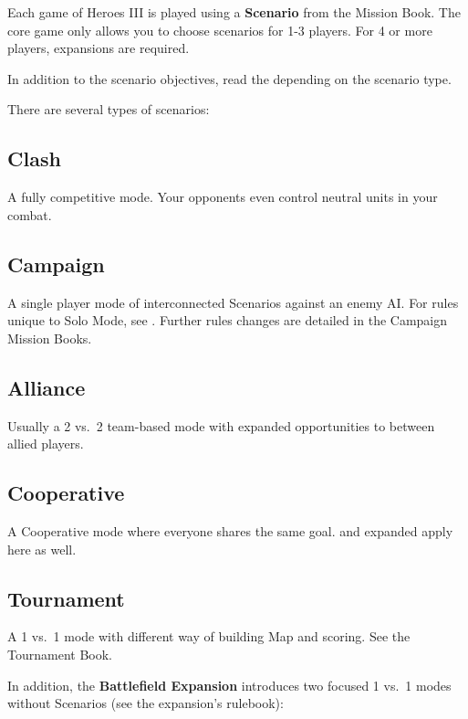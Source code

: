 
\begin{multicols*}{2}

Each game of Heroes III is played using a \textbf{Scenario} from the Mission Book. 
The core game only allows you to choose scenarios for 1-3 players. For 4 or more players, expansions are required.\par
In addition to the scenario objectives, read the  depending on the scenario type.\par 
There are several types of scenarios:

\subsection*{Clash}
A fully competitive mode. Your opponents even control neutral units in your combat.

\subsection*{Campaign}
A single player mode of interconnected Scenarios against an enemy AI.
For rules unique to Solo Mode, see .
Further rules changes are detailed in the Campaign Mission Books.

\subsection*{Alliance}
Usually a 2 vs.~2 team-based mode with expanded opportunities to  between allied players.

\subsection*{Cooperative}
A Cooperative mode where everyone shares the same goal.  and expanded  apply here as well.

\subsection*{Tournament}
A 1 vs.~1 mode with different way of building Map and scoring. See the Tournament Book.

\columnbreak

In addition, the \textbf{Battlefield Expansion} introduces two focused 1 vs.~1 modes without Scenarios (see the expansion's rulebook):


\end{multicols*}
